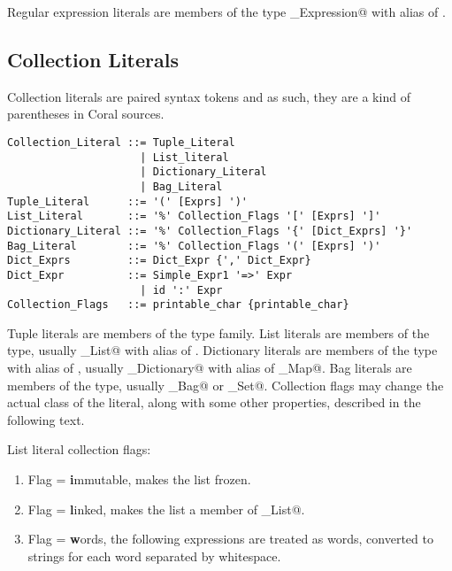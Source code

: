 Regular expression literals are members of the type \lstinline@Regular_Expression@ with alias of \lstinline@Regexp@. 






\subsection{Collection Literals}\label{sec:collectionliterals}

Collection literals are paired syntax tokens and as such, they are a kind of parentheses in Coral sources. 

\syntax\begin{lstlisting}
Collection_Literal ::= Tuple_Literal
	                 | List_literal
	                 | Dictionary_Literal
	                 | Bag_Literal
Tuple_Literal      ::= '(' [Exprs] ')'
List_Literal       ::= '%' Collection_Flags '[' [Exprs] ']'
Dictionary_Literal ::= '%' Collection_Flags '{' [Dict_Exprs] '}'
Bag_Literal        ::= '%' Collection_Flags '(' [Exprs] ')'
Dict_Exprs         ::= Dict_Expr {',' Dict_Expr}
Dict_Expr          ::= Simple_Expr1 '=>' Expr
	                 | id ':' Expr
Collection_Flags   ::= printable_char {printable_char}
\end{lstlisting}

Tuple literals are members of the \lstinline@Tuple@ type family. List literals are members of the \lstinline@List@ type, usually \lstinline@Array_List@ with alias of \lstinline@Array@. Dictionary literals are members of the \lstinline@Dictionary@ type with alias of \lstinline@Map@, usually \lstinline@Hash_Dictionary@ with alias of \lstinline@Hash_Map@. Bag literals are members of the \lstinline@Bag@ type, usually \lstinline@Hash_Bag@ or \lstinline@Hash_Set@. Collection flags may change the actual class of the literal, along with some other properties, described in the following text. 

List literal collection flags: 

\begin{enumerate}
\item Flag \lstinline@i@ = \textbf{i}mmutable, makes the list frozen. 
\item Flag \lstinline@l@ = \textbf{l}inked, makes the list a member of \lstinline@Linked_List@. 
\item Flag \lstinline@w@ = \textbf{w}ords, the following expressions are treated as words, converted to strings for each word separated by whitespace. 
\end{enumerate}

